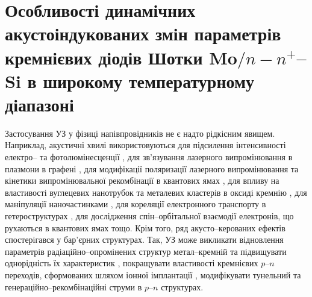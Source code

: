 \documentclass[a4paper,14pt,oneside,openany]{memoir}
\begin{document}







%










%

\chapter{Особливості динамічних акустоіндукованих змін параметрів
кремнієвих діодів Шотки Mo$/n-n^+$--Si в широкому температурному діапазоні\label{Ch_USL_T_SD}}

Застосування УЗ у фізиці напівпровідників не є надто рідкісним явищем.
Наприклад, акустичні хвилі використовуються для підсилення інтенсивності
електро-- \cite{Wang:JLum} та фотолюмінесценції \cite{Bahar2003,ZobovFTP2008},
для зв'язування лазерного випромінювання в плазмони в графені \cite{Schiefele:2011},
для модифікації поляризації лазерного випромінювання \cite{Kulakova:2012SSC} та
кінетики випромінювальної рекомбінації в квантових ямах \cite{Ostrovskii2001},
для впливу на властивості вуглецевих нанотрубок \cite{Pandey:2014}
та металевих кластерів в оксиді кремнію \cite{Roman:2006JAP,Roman:2007APL},
для маніпуляції наночастинками \cite{Bart:2011},
для кореляції електронного транспорту в гетероструктурах \cite{Buyukkose:2013,He:2010},
для дослідження спін--орбітальної взаємодії електронів, що рухаються в квантових ямах \cite{Sanada:2011} тощо.
Крім того, ряд акусто--керованих ефектів спостерігався у бар'єрних структурах.
Так, УЗ може викликати відновлення параметрів радіаційно--опромінених \cite{Gorb2010} структур метал--кремній та підвищувати
однорідність їх характеристик \cite{Olikh:PZTF2006},
покращувати властивості кремнієвих $p$--$n$ переходів, сформованих шляхом іонної імплантації \cite{YOlikh2005},
модифікувати тунельний \cite{Teterkin2009r} та генераційно--рекомбінаційні \cite{Davletova2009,Davletova2008} струми в $p$--$n$ структурах.
\end{document}
